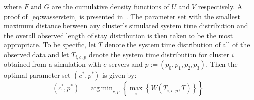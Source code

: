 \documentclass[11pt]{article}
\DeclareMathOperator*{\argmin}{arg\,min}
\begin{document}
\noindent where \(F\) and \(G\) are the cumulative density functions of \(U\)
and \(V\) respectively. A proof of~\eqref{eq:wasserstein} is presented
in~\cite{Ramdas2017}. The parameter set with the smallest maximum distance
between any cluster's simulated system time distribution and the overall
observed length of stay distribution is then taken to be the most appropriate.
To be specific, let \(T\) denote the system time distribution of all of
the observed data and let \(T_{i,c,p}\) denote the system time distribution for
cluster \(i\) obtained from a simulation with \(c\) servers and
\(p := \left(p_0, p_1, p_2, p_3\right)\). Then the optimal parameter set
\(\left(c^*, p^*\right)\) is given by:
\begin{equation}\label{eq:parameters}
    \left(c^*, p^*\right) = \argmin_{c, p} \left\{%
        \max_{i} \left\{ W\left(T_{i,c,p}, T\right) \right\}%
    \right\}
\end{equation}
\end{document}
